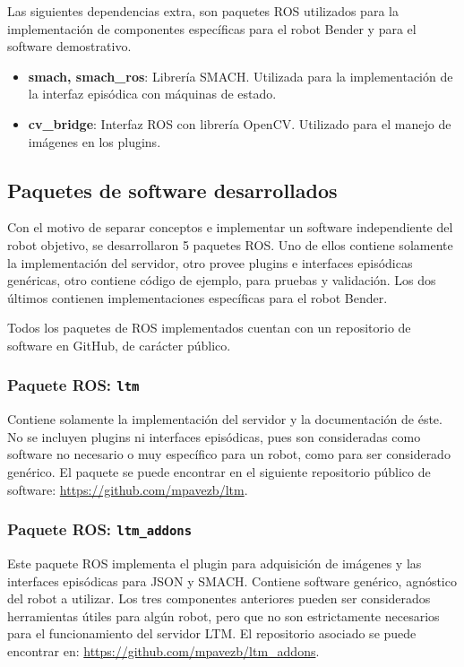 Las siguientes dependencias extra, son paquetes ROS utilizados para la implementación de componentes específicas para el robot Bender y para el software demostrativo.
\begin{itemize}
\item {\bfseries smach, smach\_ros}: Librería SMACH. Utilizada para la implementación de la interfaz episódica con máquinas de estado.
\item {\bfseries cv\_bridge}: Interfaz ROS con librería OpenCV. Utilizado para el manejo de imágenes en los plugins.
\end{itemize}


\subsection{Paquetes de software desarrollados}\label{sec:impl_packages}

Con el motivo de separar conceptos e implementar un software independiente del robot objetivo, se desarrollaron 5 paquetes ROS. Uno de ellos contiene solamente la implementación del servidor, otro provee plugins e interfaces episódicas genéricas, otro contiene código de ejemplo, para pruebas y validación. Los dos últimos contienen implementaciones específicas para el robot Bender.

Todos los paquetes de ROS implementados cuentan con un repositorio de software en GitHub, de carácter público.

\subsubsection{Paquete ROS: \texttt{ltm}}

Contiene solamente la implementación del servidor y la documentación de éste. No se incluyen plugins ni interfaces episódicas, pues son consideradas como software no necesario o muy específico para un robot, como para ser considerado genérico. El paquete se puede encontrar en el siguiente repositorio público de software: \url{https://github.com/mpavezb/ltm}.

\subsubsection{Paquete ROS: \texttt{ltm\_addons}}

Este paquete ROS implementa el plugin para adquisición de imágenes y las interfaces episódicas para JSON y SMACH. Contiene software genérico, agnóstico del robot a utilizar. Los tres componentes anteriores pueden ser considerados herramientas útiles para algún robot, pero que no son estrictamente necesarios para el funcionamiento del servidor LTM. El repositorio asociado se puede encontrar en: \url{https://github.com/mpavezb/ltm\_addons}.

